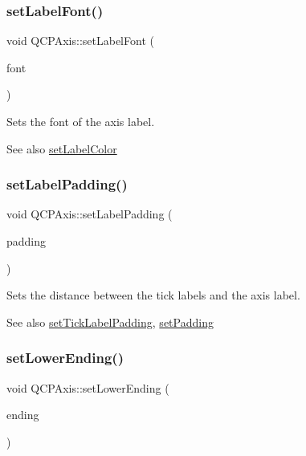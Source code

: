 \subsubsection{\texorpdfstring{setLabelFont()}{setLabelFont()}}
{\footnotesize\ttfamily void Q\+C\+P\+Axis\+::set\+Label\+Font (\begin{DoxyParamCaption}\item[{const Q\+Font \&}]{font }\end{DoxyParamCaption})}

Sets the font of the axis label.

\begin{DoxySeeAlso}{See also}
\mbox{\hyperlink{class_q_c_p_axis_a6c906fe56d75f0122335b9f79b999608}{set\+Label\+Color}} 
\end{DoxySeeAlso}
\mbox{\label{class_q_c_p_axis_a4391192a766e5d20cfe5cbc17607a7a2}} 
\subsubsection{\texorpdfstring{setLabelPadding()}{setLabelPadding()}}
{\footnotesize\ttfamily void Q\+C\+P\+Axis\+::set\+Label\+Padding (\begin{DoxyParamCaption}\item[{int}]{padding }\end{DoxyParamCaption})}

Sets the distance between the tick labels and the axis label.

\begin{DoxySeeAlso}{See also}
\mbox{\hyperlink{class_q_c_p_axis_af302c479af9dbc2e9f0e44e07c0012ee}{set\+Tick\+Label\+Padding}}, \mbox{\hyperlink{class_q_c_p_axis_a5691441cb3de9e9844855d339c0db279}{set\+Padding}} 
\end{DoxySeeAlso}
\mbox{\label{class_q_c_p_axis_a08af1c72db9ae4dc8cb8a973d44405ab}} 
\subsubsection{\texorpdfstring{setLowerEnding()}{setLowerEnding()}}
{\footnotesize\ttfamily void Q\+C\+P\+Axis\+::set\+Lower\+Ending (\begin{DoxyParamCaption}\item[{const \mbox{\hyperlink{class_q_c_p_line_ending}{Q\+C\+P\+Line\+Ending}} \&}]{ending }\end{DoxyParamCaption})}

